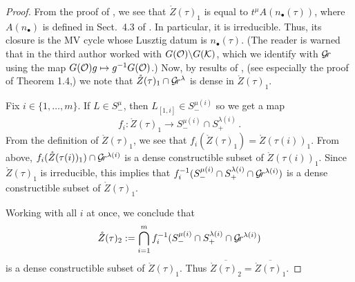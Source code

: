 \documentclass[draft]{article} %
\begin{document}
\begin{proof}
From  the proof of \cite[Proposition 9.6]{kamnitzer2010mirkovic}, we see that $ \mathring Z(\tau)_1$ is equal to $ t^\mu A(n_\bullet(\tau))$, where $ A(n_\bullet)$ is defined in Sect.\ 4.3 of \cite{kamnitzer2010mirkovic}. In particular, it is irreducible. Thus, its closure is the MV cycle whose Lusztig datum is $ n_\bullet(\tau) $. (The reader is warned that in \cite{kamnitzer2010mirkovic} the third author worked with $  G(\mathcal O) \backslash G(\mathcal K)$, which we identify with $ \mathcal{G}\!r $ using the map $ G(\mathcal O) g \mapsto g^{-1} G(\mathcal O)$.) 
% 
Now, by results of \cite{kamnitzer2008hives}, (see especially the proof of Theorem 1.4,) we note that $\mathring Z(\tau)_1\cap \mathcal{G}\!r^\lambda$ is dense in $ \mathring Z(\tau)_1$. 
% 
% 

Fix $ i \in \{1, \dots, m\}$. If $ L \in S^\mu_-$, then $ L_{[1,i]} \in S^{\mu(i)}_-$ so we get a map 
$$ 
f_i : \mathring Z(\tau)_1 \rightarrow S^{\mu(i)}_- \cap S_+^{\lambda(i)} \,. 
$$
From the definition of $ \mathring Z(\tau)_1 $, we see that $ f_i(\mathring Z(\tau)_1 )= \mathring Z(\tau(i))_1$.  
From above, $  f_i(\mathring Z(\tau(i))_1) \cap \mathcal{G}\!r^{\lambda(i)}$ is a dense constructible subset of $\mathring Z(\tau(i))_1$.  
Since $ \mathring Z(\tau)_1$ is irreducible, this implies that $ f_i^{-1}(S^{\mu(i)}_- \cap S_+^{\lambda(i)} \cap \mathcal{G}\!r^{\lambda(i)}) $ 
is a dense constructible subset of $ \mathring Z(\tau)_1 $.  

Working with all $ i $ at once, we conclude that
$$ 
\mathring Z(\tau)_2 := \bigcap_{i=1}^m f_i^{-1}(S^{\mu(i)}_- \cap S_+^{\lambda(i)} \cap \mathcal{G}\!r^{\lambda(i)}) 
$$
is a dense constructible subset of $\mathring Z(\tau)_1$. 
Thus $\overline{\mathring Z(\tau)_2} = \overline{\mathring Z(\tau)_1}$.


\end{proof}
\end{document}

